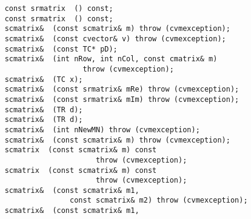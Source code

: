 \verb"    const srmatrix "\verb" () const;"\\
\verb"    const srmatrix "\verb" () const;"\\
\verb"    scmatrix& "\verb" (const scmatrix& m) throw (cvmexception);"\\
\verb"    scmatrix& "\verb" (const cvector& v) throw (cvmexception);"\\
\verb"    scmatrix& "\verb" (const TC* pD);"\\
\verb"    scmatrix& "\verb" (int nRow, int nCol, const cmatrix& m)"\\
\verb"                      throw (cvmexception);"\\
\verb"    scmatrix& "\verb" (TC x);"\\
\verb"    scmatrix& "\verb" (const srmatrix& mRe) throw (cvmexception);"\\
\verb"    scmatrix& "\verb" (const srmatrix& mIm) throw (cvmexception);"\\
\verb"    scmatrix& "\verb" (TR d);"\\
\verb"    scmatrix& "\verb" (TR d);"\\
\verb"    scmatrix& "\verb" (int nNewMN) throw (cvmexception);"\\
\verb"    scmatrix& "\verb" (const scmatrix& m) throw (cvmexception);"\\
\verb"    scmatrix "\verb" (const scmatrix& m) const"\\
\verb"                         throw (cvmexception);"\\
\verb"    scmatrix "\verb" (const scmatrix& m) const"\\
\verb"                         throw (cvmexception);"\\
\verb"    scmatrix& "\verb" (const scmatrix& m1,"\\
\verb"                   const scmatrix& m2) throw (cvmexception);"\\
\verb"    scmatrix& "\verb" (const scmatrix& m1,"\\

